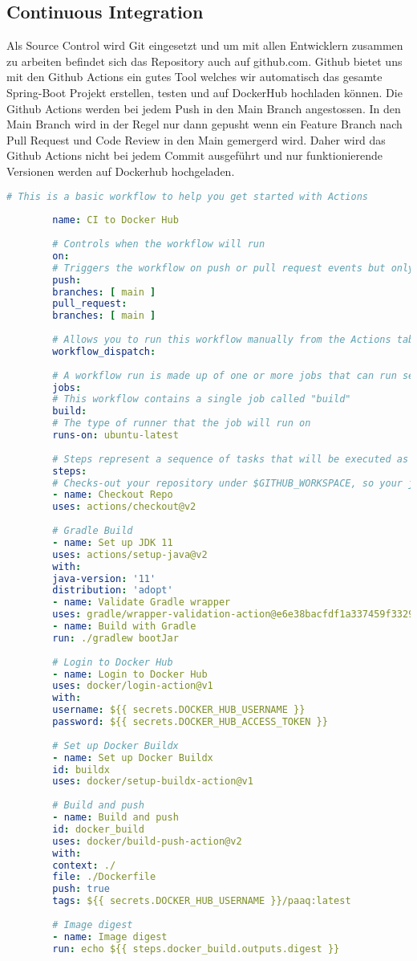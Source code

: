 \documentclass[../main.tex]{subfiles}
\begin{document}
	\subsection{Continuous Integration}
	Als Source Control wird Git eingesetzt und um mit allen Entwicklern zusammen zu arbeiten befindet sich das Repository auch auf github.com. Github bietet uns mit den Github Actions ein gutes Tool welches wir automatisch das gesamte Spring-Boot Projekt erstellen, testen und auf DockerHub hochladen können. Die Github Actions werden bei jedem Push in den Main Branch angestossen. In den Main Branch wird in der Regel nur dann gepusht wenn ein Feature Branch nach Pull Request und Code Review in den Main gemergerd wird. Daher wird das Github Actions nicht bei jedem Commit ausgeführt und nur funktionierende Versionen werden auf Dockerhub hochgeladen.
	\begin{lstlisting}[language=yaml]
		# This is a basic workflow to help you get started with Actions
		
		name: CI to Docker Hub
		
		# Controls when the workflow will run
		on:
		# Triggers the workflow on push or pull request events but only for the main branch
		push:
		branches: [ main ]
		pull_request:
		branches: [ main ]
		
		# Allows you to run this workflow manually from the Actions tab
		workflow_dispatch:
		
		# A workflow run is made up of one or more jobs that can run sequentially or in parallel
		jobs:
		# This workflow contains a single job called "build"
		build:
		# The type of runner that the job will run on
		runs-on: ubuntu-latest
		
		# Steps represent a sequence of tasks that will be executed as part of the job
		steps:
		# Checks-out your repository under $GITHUB_WORKSPACE, so your job can access it
		- name: Checkout Repo
		uses: actions/checkout@v2
		
		# Gradle Build
		- name: Set up JDK 11
		uses: actions/setup-java@v2
		with:
		java-version: '11'
		distribution: 'adopt'
		- name: Validate Gradle wrapper
		uses: gradle/wrapper-validation-action@e6e38bacfdf1a337459f332974bb2327a31aaf4b
		- name: Build with Gradle
		run: ./gradlew bootJar
		
		# Login to Docker Hub
		- name: Login to Docker Hub
		uses: docker/login-action@v1
		with:
		username: ${{ secrets.DOCKER_HUB_USERNAME }}
		password: ${{ secrets.DOCKER_HUB_ACCESS_TOKEN }}
		
		# Set up Docker Buildx
		- name: Set up Docker Buildx
		id: buildx
		uses: docker/setup-buildx-action@v1
		
		# Build and push
		- name: Build and push
		id: docker_build
		uses: docker/build-push-action@v2
		with:
		context: ./
		file: ./Dockerfile
		push: true
		tags: ${{ secrets.DOCKER_HUB_USERNAME }}/paaq:latest
		
		# Image digest
		- name: Image digest
		run: echo ${{ steps.docker_build.outputs.digest }}
	\end{lstlisting}
	
\end{document}
